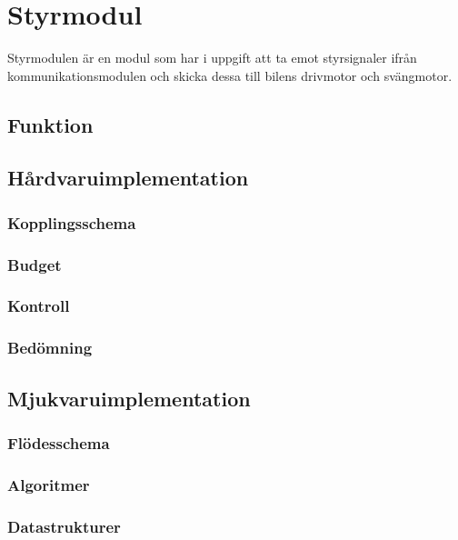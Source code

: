 \documentclass[designspec/spec.tex]{subfiles}
\begin{document}
\section{Styrmodul}
Styrmodulen är en modul som har i uppgift att ta emot styrsignaler ifrån
kommunikationsmodulen och skicka dessa till bilens drivmotor och svängmotor.

\subsection{Funktion}

\subsection{Hårdvaruimplementation}
\subsubsection{Kopplingsschema}

\subsubsection{Budget}

\subsubsection{Kontroll}

\subsubsection{Bedömning}

\subsection{Mjukvaruimplementation}

\subsubsection{Flödesschema}

\subsubsection{Algoritmer}

\subsubsection{Datastrukturer}
\end{document}
